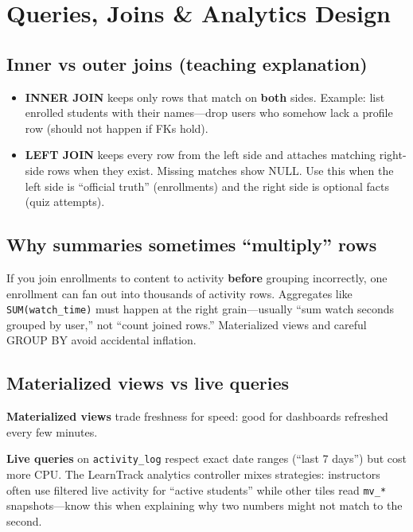
\chapter{Queries, Joins \& Analytics Design}
\label{ch:analytics}

\section{Inner vs outer joins (teaching explanation)}
\begin{itemize}[leftmargin=*]
  \item \textbf{INNER JOIN} keeps only rows that match on \textbf{both} sides. Example: list enrolled students with their names---drop users who somehow lack a profile row (should not happen if FKs hold).

  \item \textbf{LEFT JOIN} keeps every row from the left side and attaches matching right-side rows when they exist. Missing matches show NULL. Use this when the left side is ``official truth'' (enrollments) and the right side is optional facts (quiz attempts).

\end{itemize}

\section{Why summaries sometimes ``multiply'' rows}
If you join enrollments to content to activity \textbf{before} grouping incorrectly, one enrollment can fan out into thousands of activity rows. Aggregates like \texttt{SUM(watch\_time)} must happen at the right grain---usually ``sum watch seconds grouped by user,'' not ``count joined rows.'' Materialized views and careful GROUP BY avoid accidental inflation.

\section{Materialized views vs live queries}
\textbf{Materialized views} trade freshness for speed: good for dashboards refreshed every few minutes.

\textbf{Live queries} on \texttt{activity\_log} respect exact date ranges (``last 7 days'') but cost more CPU. The LearnTrack analytics controller mixes strategies: instructors often use filtered live activity for ``active students'' while other tiles read \texttt{mv\_*} snapshots---know this when explaining why two numbers might not match to the second.

